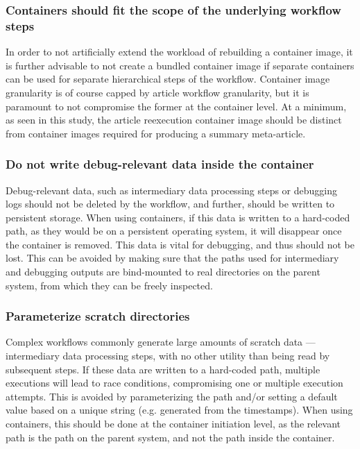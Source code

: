 \subsubsection{Containers should fit the scope of the underlying workflow steps}
In order to not artificially extend the workload of rebuilding a container image, it is further advisable to not create a bundled container image if separate containers can be used for separate hierarchical steps of the workflow.
Container image granularity is of course capped by article workflow granularity, but it is paramount to not compromise the former at the container level.
At a minimum, as seen in this study, the article reexecution container image should be distinct from container images required for producing a summary meta-article.

\subsubsection{Do not write debug-relevant data inside the container}
Debug-relevant data, such as intermediary data processing steps or debugging logs should not be deleted by the workflow, and further, should be written to persistent storage.
When using containers, if this data is written to a hard-coded path, as they would be on a persistent operating system, it will disappear once the container is removed.
This data is vital for debugging, and thus should not be lost.
This can be avoided by making sure that the paths used for intermediary and debugging outputs are bind-mounted to real directories on the parent system, from which they can be freely inspected.

\subsubsection{Parameterize scratch directories}
Complex workflows commonly generate large amounts of scratch data — intermediary data processing steps, with no other utility than being read by subsequent steps.
If these data are written to a hard-coded path, multiple executions will lead to race conditions, compromising one or multiple execution attempts.
This is avoided by parameterizing the path and/or setting a default value based on a unique string (e.g. generated from the timestamps).
When using containers, this should be done at the container initiation level, as the relevant path is the path on the parent system, and not the path inside the container.

